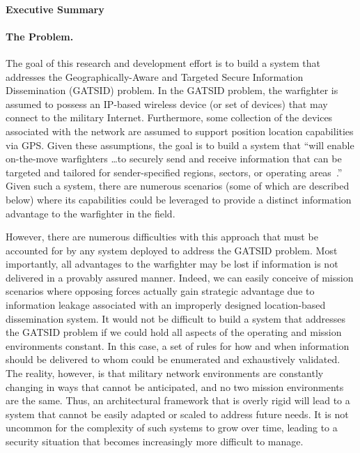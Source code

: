 \documentclass{sbir}
\begin{document}
\paragraph{Executive Summary}
\paragraph{The Problem.} The goal of this research and development effort is to build a system that addresses the Geographically-Aware and Targeted Secure Information Dissemination (GATSID) problem. In the GATSID problem, the warfighter is assumed to possess an IP-based wireless device (or set of devices) that may connect to the military Internet. Furthermore, some collection of the devices associated with the network are assumed to support position location capabilities via GPS. Given these assumptions, the goal is to build a system that ``will enable on-the-move warfighters \ldots to securely send and receive information that can be targeted and tailored for sender-specified regions, sectors, or operating areas~\cite{AF131-039}.'' Given such a system, there are numerous scenarios (some of which are described below) where its capabilities could be leveraged to provide a distinct information advantage to the warfighter in the field.

However, there are numerous difficulties with this approach that must be accounted for by any system deployed to address the GATSID problem. Most importantly, all advantages to the warfighter may be lost if information is not delivered in a provably assured manner. Indeed, we can easily conceive of mission scenarios where opposing forces actually gain strategic advantage due to information leakage associated with an improperly designed location-based dissemination system. It would not be difficult to build a system that addresses the GATSID problem if we could hold all aspects of the operating and mission environments constant. In this case, a set of rules for how and when information should be delivered to whom could be enumerated and exhaustively validated. The reality, however, is that military network environments are constantly changing in ways that cannot be anticipated, and no two mission environments are the same. Thus, an architectural framework that is overly rigid will lead to a system that cannot be easily adapted or scaled to address future needs. It is not uncommon for the complexity of such systems to grow over time, leading to a security situation that becomes increasingly more difficult to manage.
\end{document}
